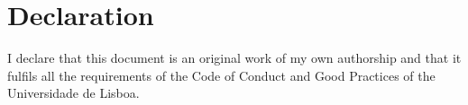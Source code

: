 \section*{Declaration}

I declare that this document is an original work of my own authorship and that it fulfils all the requirements of the Code of Conduct and Good Practices of the Universidade de Lisboa.